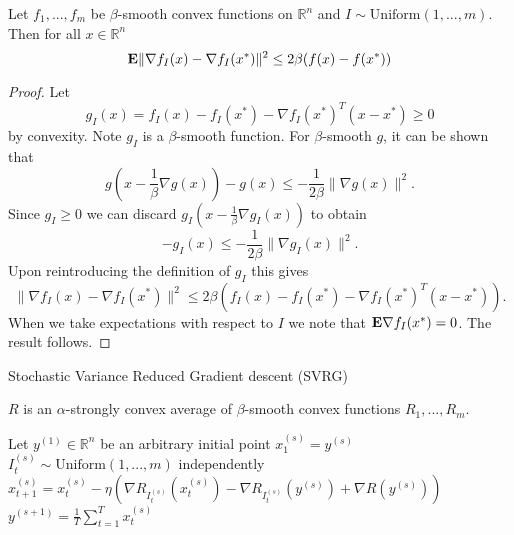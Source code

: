 \begin{lemma}
\label{lemma:randsmoothbound}
Let $f_1, ..., f_m$ be $\beta$-smooth convex functions on $\mathbb{R}^n$ and $I \sim \text{Uniform}(1, ..., m)$. Then for all $x \in \mathbb{R}^n$
\begin{equation}
	\mathbf{E} \|\nabla f_I(x) - \nabla f_I(x^*)\|^2 \le 2\beta (f(x) - f(x^*))
\end{equation} 
\begin{proof}
Let
\begin{equation}
	g_I(x) = f_I(x) - f_I(x^*) - \nabla f_I(x^*)^T(x-x^*) \ge 0
\end{equation}
by convexity. Note $g_I$ is a $\beta$-smooth function.
For $\beta$-smooth $g$, it can be shown that
\begin{equation}
	g\left(x - \frac{1}{\beta}\nabla g(x)\right) - g(x) \le -\frac{1}{2\beta}\|\nabla g(x)\|^2.
\end{equation}
Since $g_I \ge 0$ we can discard $g_I\left(x - \frac{1}{\beta}\nabla g_I(x)\right)$ to obtain
\begin{equation}
 -g_I(x) \le -\frac{1}{2\beta}\|\nabla g_I(x)\|^2.
\end{equation}
Upon reintroducing the definition of $g_I$ this gives
\begin{equation}
	\|\nabla f_I(x) - \nabla f_I(x^*)\|^2 \le 2\beta \left(f_I(x) - f_I(x^*) - \nabla f_I(x^*)^T (x - x^*)\right).
\end{equation}
When we take expectations with respect to $I$ we note that $\mathbf{E} \nabla f_I(x^*) = 0$. The result follows.

\end{proof}
\end{lemma}

\begin{algorithm}
\caption{Stochastic Variance Reduced Gradient descent (SVRG)}
   \begin{algorithmic}[1] \label{alg:svrg}
   \REQUIRE $R$ is an $\alpha$-strongly convex average of $\beta$-smooth convex functions $R_1, ..., R_m$.
   
   \STATE Let $y^{(1)} \in \mathbb{R}^n$ be an arbitrary initial point
   	  \STATE $x_1^{(s)} = y^{(s)}$
   	      \STATE $I_t^{(s)} \sim \text{Uniform}(1, ..., m)$ independently
   	  	  \STATE $x_{t+1}^{(s)} = x_t^{(s)} - \eta \left(\nabla R_{I_t^{(s)}}(x_t^{(s)}) - \nabla R_{I_t^{(s)}}(y^{(s)}) + \nabla R(y^{(s)})\right)$
   	  \ENDFOR
   	  \STATE $y^{(s+1)} = \frac{1}{T}\sum_{t=1}^T x_t^{(s)}$
   \ENDFOR	  
\end{algorithmic}
\end{algorithm}


